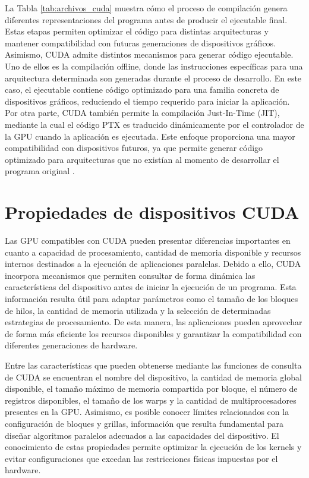 La Tabla \ref{tab:archivos_cuda} muestra cómo el proceso de compilación genera diferentes representaciones del programa antes de producir el ejecutable final. Estas etapas permiten optimizar el código para distintas arquitecturas y mantener compatibilidad con futuras generaciones de dispositivos gráficos. Asimismo, CUDA admite distintos mecanismos para generar código ejecutable. Uno de ellos es la compilación offline, donde las instrucciones específicas para una arquitectura determinada son generadas durante el proceso de desarrollo. En este caso, el ejecutable contiene código optimizado para una familia concreta de dispositivos gráficos, reduciendo el tiempo requerido para iniciar la aplicación. Por otra parte, CUDA también permite la compilación Just-In-Time (JIT), mediante la cual el código PTX es traducido dinámicamente por el controlador de la GPU cuando la aplicación es ejecutada. Este enfoque proporciona una mayor compatibilidad con dispositivos futuros, ya que permite generar código optimizado para arquitecturas que no existían al momento de desarrollar el programa original \cite{nvccGuide,nvidiaProgrammingGuide}.

\section{Propiedades de dispositivos CUDA}

Las GPU compatibles con CUDA pueden presentar diferencias importantes en cuanto a capacidad de procesamiento, cantidad de memoria disponible y recursos internos destinados a la ejecución de aplicaciones paralelas. Debido a ello, CUDA incorpora mecanismos que permiten consultar de forma dinámica las características del dispositivo antes de iniciar la ejecución de un programa. Esta información resulta útil para adaptar parámetros como el tamaño de los bloques de hilos, la cantidad de memoria utilizada y la selección de determinadas estrategias de procesamiento. De esta manera, las aplicaciones pueden aprovechar de forma más eficiente los recursos disponibles y garantizar la compatibilidad con diferentes generaciones de hardware.

Entre las características que pueden obtenerse mediante las funciones de consulta de CUDA se encuentran el nombre del dispositivo, la cantidad de memoria global disponible, el tamaño máximo de memoria compartida por bloque, el número de registros disponibles, el tamaño de los warps y la cantidad de multiprocesadores presentes en la GPU. Asimismo, es posible conocer límites relacionados con la configuración de bloques y grillas, información que resulta fundamental para diseñar algoritmos paralelos adecuados a las capacidades del dispositivo. El conocimiento de estas propiedades permite optimizar la ejecución de los kernels y evitar configuraciones que excedan las restricciones físicas impuestas por el hardware.

